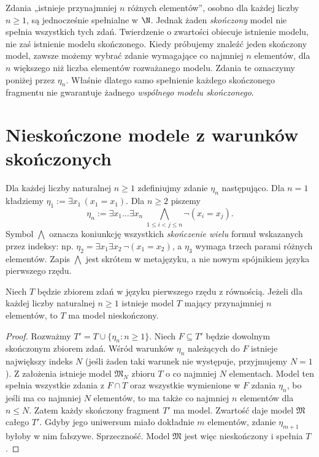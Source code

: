 \begin{przyklad}
Zdania „istnieje przynajmniej $n$ różnych elementów”, osobno dla każdej liczby $n\ge1$, są jednocześnie spełnialne w $\N$. Jednak żaden \emph{skończony} model nie spełnia wszystkich tych zdań. Twierdzenie o zwartości obiecuje istnienie modelu, nie zaś istnienie modelu skończonego.
Kiedy próbujemy znaleźć jeden skończony model, zawsze możemy wybrać
zdanie wymagające co najmniej $n$ elementów, dla $n$ większego niż liczba elementów rozważanego modelu. Zdania te oznaczymy poniżej przez $\eta_n$.
Właśnie dlatego samo spełnienie każdego skończonego fragmentu
nie gwarantuje żadnego \emph{wspólnego modelu skończonego}.
\end{przyklad}

\section{Nieskończone modele z warunków skończonych}\label{sec:compactness-infinite}
\begin{definicja}\label{def:compactness-at-least-n}
Dla każdej liczby naturalnej $n\ge1$ zdefiniujmy zdanie $\eta_n$ następująco.
Dla $n=1$ kładziemy $\eta_1:=\exists x_1\,(x_1=x_1)$.
Dla $n\ge2$ piszemy
\[
\eta_n:=\exists x_1\ldots\exists x_n\;\bigwedge_{1\le i<j\le n}\neg(x_i=x_j).
\]
Symbol $\bigwedge$ oznacza koniunkcję wszystkich \emph{skończenie wielu}
formuł wskazanych przez indeksy: np.
$\eta_2=\exists x_1\exists x_2\,\neg(x_1=x_2)$,
a $\eta_3$ wymaga trzech parami różnych elementów.
Zapis $\bigwedge$ jest skrótem w metajęzyku, a nie nowym
spójnikiem języka pierwszego rzędu.
\end{definicja}

\begin{twierdzenie}\label{thm:compactness-infinite-model}
Niech $T$ będzie zbiorem zdań w języku pierwszego rzędu z równością. Jeżeli dla każdej liczby naturalnej $n\ge1$ istnieje model $T$ mający przynajmniej $n$ elementów, to $T$ ma model nieskończony.
\end{twierdzenie}
\begin{proof}
Rozważmy $T'=T\cup\{\eta_n:n\ge1\}$. Niech $F\subseteq T'$ będzie dowolnym skończonym zbiorem zdań. Wśród warunków $\eta_n$ należących do $F$ istnieje największy indeks $N$ (jeśli żaden taki warunek nie występuje, przyjmujemy $N=1$). Z założenia istnieje model $\mathfrak M_N$ zbioru $T$ o co najmniej $N$ elementach. Model ten spełnia wszystkie zdania z $F\cap T$ oraz wszystkie wymienione w $F$ zdania $\eta_n$, bo jeśli ma co najmniej $N$ elementów, to ma także co najmniej $n$ elementów dla $n\le N$. Zatem każdy skończony fragment $T'$ ma model. Zwartość daje model $\mathfrak M$ całego $T'$. Gdyby jego uniwersum miało dokładnie $m$ elementów, zdanie $\eta_{m+1}$ byłoby w nim fałszywe. Sprzeczność. Model $\mathfrak M$ jest więc nieskończony i spełnia $T$.
\end{proof}

